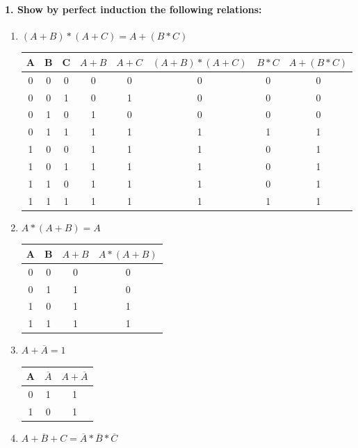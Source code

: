 \documentclass{article}
\begin{document}
\paragraph{1. Show by perfect induction the following relations:}

\begin{enumerate}
	\item $(A+B)*(A+C)=A+(B*C)$
	
	\begin{table}[H]
		\centering
		\begin{tabular}{|c|c|c|c|c|c|c|c|}
			\hline
			A & B & C & $A+B$ & $A+C$ & $(A+B)*(A+C)$ & $B*C$ & $A+(B*C)$ \\\hline
			0 & 0 & 0 & 0   & 0   & 0           & 0   & 0       \\\hline
			0 & 0 & 1 & 0   & 1   & 0           & 0   & 0       \\\hline
			0 & 1 & 0 & 1   & 0   & 0           & 0   & 0\\\hline
			0 & 1 & 1 & 1   & 1   & 1           & 1   & 1\\\hline
			1 & 0 & 0 & 1   & 1   & 1           & 0   & 1\\\hline
			1 & 0 & 1 & 1   & 1   & 1           & 0   & 1\\\hline
			1 & 1 & 0 & 1   & 1   & 1           & 0   & 1\\\hline
			1 & 1 & 1 & 1   & 1   & 1           & 1   & 1\\\hline
		\end{tabular}
	\end{table}
	\item $A*(A+B)=A$

	\begin{table}[H]
		\centering
		\begin{tabular}{|c|c|c|c|}
			\hline
			A & B & $A+B$ & $A*(A+B)$ \\\hline
			0 & 0 & 0   & 0       \\\hline
			0 & 1 & 1   & 0       \\\hline
			1 & 0 & 1   & 1       \\\hline
			1 & 1 & 1   & 1       \\\hline
		\end{tabular}
	\end{table}	
	\item $A+\overline{A}=1$
	
	\begin{table}[H]
		\centering
		\begin{tabular}{|c|c|c|}
			\hline
			A & $\overline{A}$ & $A+\overline{A}$ \\\hline
			0 & 1 		   & 1              \\\hline
			1 & 0 		   & 1              \\\hline
		\end{tabular}
	\end{table}	
	\item $\overline{A+B+C} = \overline{A}*\overline{B}*\overline{C}$
	

\end{enumerate}
\end{document}
